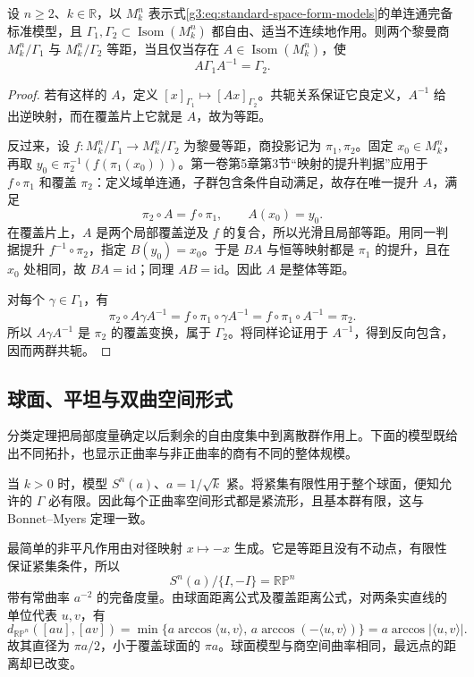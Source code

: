 \begin{proposition}\label{g3:prop:space-form-isometry-conjugacy}
	设 \(n\ge2\)、\(k\in\mathbb R\)，以 \(M_k^n\) 表示式\eqref{g3:eq:standard-space-form-models}的单连通完备标准模型，且 \(\Gamma_1,\Gamma_2\subset\operatorname{Isom}(M_k^n)\) 都自由、适当不连续地作用。则两个黎曼商 \(M_k^n/\Gamma_1\) 与 \(M_k^n/\Gamma_2\) 等距，当且仅当存在 \(A\in\operatorname{Isom}(M_k^n)\)，使
	\[
		A\Gamma_1A^{-1}=\Gamma_2.
	\]
\end{proposition}
\begin{proof}
	若有这样的 \(A\)，定义 \([x]_{\Gamma_1}\mapsto[Ax]_{\Gamma_2}\)。共轭关系保证它良定义，\(A^{-1}\) 给出逆映射，而在覆盖片上它就是 \(A\)，故为等距。

	反过来，设 \(f:M_k^n/\Gamma_1\to M_k^n/\Gamma_2\) 为黎曼等距，商投影记为 \(\pi_1,\pi_2\)。固定 \(x_0\in M_k^n\)，再取 \(y_0\in\pi_2^{-1}(f(\pi_1(x_0)))\)。第一卷第5章第3节“映射的提升判据”应用于 \(f\circ\pi_1\) 和覆盖 \(\pi_2\)：定义域单连通，子群包含条件自动满足，故存在唯一提升 \(A\)，满足
	\[
		\pi_2\circ A=f\circ\pi_1,\qquad A(x_0)=y_0.
	\]
	在覆盖片上，\(A\) 是两个局部覆盖逆及 \(f\) 的复合，所以光滑且局部等距。用同一判据提升 \(f^{-1}\circ\pi_2\)，指定 \(B(y_0)=x_0\)。于是 \(BA\) 与恒等映射都是 \(\pi_1\) 的提升，且在 \(x_0\) 处相同，故 \(BA=\mathrm{id}\)；同理 \(AB=\mathrm{id}\)。因此 \(A\) 是整体等距。

	对每个 \(\gamma\in\Gamma_1\)，有
	\[
		\pi_2\circ A\gamma A^{-1}
		=f\circ\pi_1\circ\gamma A^{-1}
		=f\circ\pi_1\circ A^{-1}=\pi_2.
	\]
	所以 \(A\gamma A^{-1}\) 是 \(\pi_2\) 的覆盖变换，属于 \(\Gamma_2\)。将同样论证用于 \(A^{-1}\)，得到反向包含，因而两群共轭。
\end{proof}

\subsection{球面、平坦与双曲空间形式}
\label{g3:subsec:0902:04}

分类定理把局部度量确定以后剩余的自由度集中到离散群作用上。下面的模型既给出不同拓扑，也显示正曲率与非正曲率的商有不同的整体规模。

\begin{example}\label{g3:exm:spherical-space-form-quotients}
	当 \(k>0\) 时，模型 \(S^n(a)\)、\(a=1/\sqrt{k}\) 紧。将紧集有限性用于整个球面，便知允许的 \(\Gamma\) 必有限。因此每个正曲率空间形式都是紧流形，且基本群有限，这与 Bonnet--Myers 定理一致。

	最简单的非平凡作用由对径映射 \(x\mapsto-x\) 生成。它是等距且没有不动点，有限性保证紧集条件，所以
	\[
		S^n(a)/\{I,-I\}=\mathbb {RP}^n
	\]
	带有常曲率 \(a^{-2}\) 的完备度量。由球面距离公式及覆盖距离公式，对两条实直线的单位代表 \(u,v\)，有
	\[
		d_{\mathbb {RP}^n}([au],[av])
		=\min\{a\arccos\langle u,v\rangle,\,
		a\arccos(-\langle u,v\rangle)\}
		=a\arccos|\langle u,v\rangle|.
	\]
	故其直径为 \(\pi a/2\)，小于覆盖球面的 \(\pi a\)。球面模型与商空间曲率相同，最远点的距离却已改变。
\end{example}


